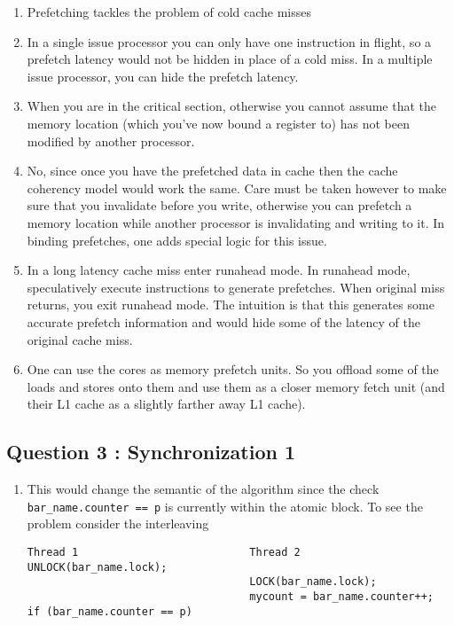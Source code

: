 \begin{enumerate}
\def\labelenumi{\alph{enumi}.}
\itemsep1pt\parskip0pt
\item
  Prefetching tackles the problem of cold cache misses
\item
  In a single issue processor you can only have one instruction in
  flight, so a prefetch latency would not be hidden in place of a cold
  miss. In a multiple issue processor, you can hide the prefetch
  latency.
\item
  When you are in the critical section, otherwise you cannot assume that
  the memory location (which you've now bound a register to) has not
  been modified by another processor.
\item
  No, since once you have the prefetched data in cache then the cache
  coherency model would work the same. Care must be taken however to
  make sure that you invalidate before you write, otherwise you can
  prefetch a memory location while another processor is invalidating and
  writing to it. In binding prefetches, one adds special logic for this
  issue.
\item
  In a long latency cache miss enter runahead mode. In runahead mode,
  speculatively execute instructions to generate prefetches. When
  original miss returns, you exit runahead mode. The intuition is that
  this generates some accurate prefetch information and would hide some
  of the latency of the original cache miss.
\item
  One can use the cores as memory prefetch units. So you offload some of
  the loads and stores onto them and use them as a closer memory fetch
  unit (and their L1 cache as a slightly farther away L1 cache).
\end{enumerate}

\subsection{Question 3 : Synchronization
1}\label{question-3-synchronization-1}

\begin{enumerate}
\def\labelenumi{\alph{enumi}.}
\item
  This would change the semantic of the algorithm since the check
  \texttt{bar\_name.counter == p} is currently within the atomic block.
  To see the problem consider the interleaving

\begin{verbatim}
Thread 1                           Thread 2
UNLOCK(bar_name.lock);
                                   LOCK(bar_name.lock);
                                   mycount = bar_name.counter++;
if (bar_name.counter == p)
\end{verbatim}
\end{enumerate}

